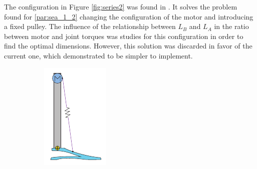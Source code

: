 The configuration in Figure \ref{fig:series2} was found in \cite{biobiped}.
It solves the problem found for \ref{par:sea_1_2} changing the configuration of the motor and introducing a fixed pulley.
The influence of the relationship between $L_{B}$ and $L_{A}$ in the ratio between motor and joint torques was studies for this configuration in order to find the optimal dimensions.
However, this solution was discarded in favor of the current one, which demonstrated to be simpler to implement.

\begin{figure}[h]
\centering
  \begin{subfigure}{.19\textwidth}
    \centering
    \includegraphics[width=\linewidth]{figures/illustration_serial_direct_i.pdf}

\end{subfigure}
\end{figure}
